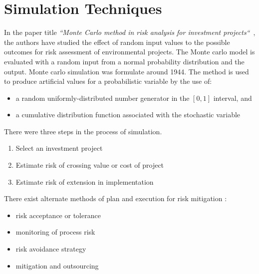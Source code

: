 %
%
%
%

\setlength{\footskip}{8mm}

\section{Simulation Techniques} 
\label{visualization-techniques}

In the paper title \textit{``Monte Carlo method in risk analysis for investment projects``}~, the authors have studied the effect of random input values to the possible outcomes for risk assessment of environmental projects. The Monte carlo model is evaluated with a random input from a normal probability distribution and the output. 
Monte carlo simulation was formulate around 1944. The method is used to produce artificial values for a probabilistic variable by the use of:
\begin{itemize}
	\item a random uniformly-distributed number generator in the $ [0,1] $ interval, and
	\item a cumulative distribution function associated with the stochastic variable
\end{itemize} 
There were three steps in the process of simulation. 
\begin{enumerate}
	\item Select an investment project
	\item Estimate risk of crossing value or cost of project
	\item Estimate risk of extension in implementation
\end{enumerate}
There exist alternate methods of plan and execution for risk mitigation :
\begin{itemize}
	\item risk acceptance or tolerance
	\item monitoring of process risk
	\item risk avoidance strategy
	\item mitigation and outsourcing
\end{itemize}

%
%
%
%

\setlength{\footskip}{8mm}

